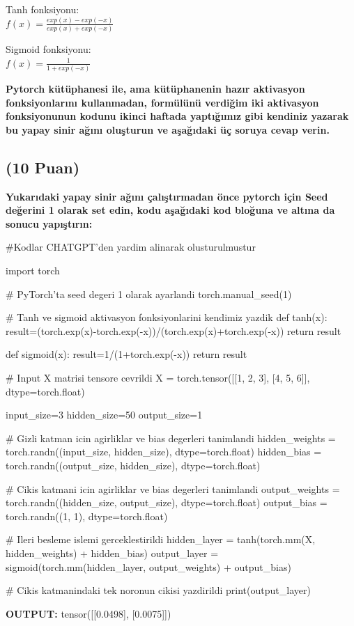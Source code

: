 \documentclass[11pt]{article}
\begin{document}
Tanh fonksiyonu:\\
$f(x) = \frac{exp(x) - exp(-x)}{exp(x) + exp(-x)}$
\vspace{.2in}

Sigmoid fonksiyonu:\\
$f(x) = \frac{1}{1 + exp(-x)}$

\vspace{.2in}
 \textbf{Pytorch kütüphanesi ile, ama kütüphanenin hazır aktivasyon fonksiyonlarını kullanmadan, formülünü verdiğim iki aktivasyon fonksiyonunun kodunu ikinci haftada yaptığımız gibi kendiniz yazarak bu yapay sinir ağını oluşturun ve aşağıdaki üç soruya cevap verin.}
 
\subsection{(10 Puan)} \textbf{Yukarıdaki yapay sinir ağını çalıştırmadan önce pytorch için Seed değerini 1 olarak set edin, kodu aşağıdaki kod bloğuna ve altına da sonucu yapıştırın:}

\begin{python}
#Kodlar CHATGPT'den yardim alinarak olusturulmustur

import torch

# PyTorch'ta seed degeri 1 olarak ayarlandi
torch.manual_seed(1)

# Tanh ve sigmoid aktivasyon fonksiyonlarini kendimiz yazdik
def tanh(x):
    result=(torch.exp(x)-torch.exp(-x))/(torch.exp(x)+torch.exp(-x))
    return result

def sigmoid(x):
    result=1/(1+torch.exp(-x)) 
    return result

# Input X matrisi tensore cevrildi
X = torch.tensor([[1, 2, 3], [4, 5, 6]], dtype=torch.float)

input_size=3
hidden_size=50
output_size=1

# Gizli katman icin agirliklar ve bias degerleri tanimlandi
hidden_weights = torch.randn((input_size, hidden_size), dtype=torch.float)
hidden_bias = torch.randn((output_size, hidden_size), dtype=torch.float)

# Cikis katmani icin agirliklar ve bias degerleri tanimlandi
output_weights = torch.randn((hidden_size, output_size), dtype=torch.float)
output_bias = torch.randn((1, 1), dtype=torch.float)

# Ileri besleme islemi gerceklestirildi
hidden_layer = tanh(torch.mm(X, hidden_weights) + hidden_bias)
output_layer = sigmoid(torch.mm(hidden_layer, output_weights) + output_bias)

# Cikis katmanindaki tek noronun cikisi yazdirildi
print(output_layer)


\end{python}
\textbf{OUTPUT:}
tensor([[0.0498],
        [0.0075]])
\end{document}

